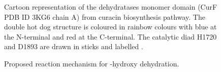 			\setlength\fboxsep{5pt}
 			\setlength\fboxrule{1.5pt}
			\begin{figure} []
			\centering
			\caption[Cartoon representation of the dehydratases domain from curacin biosynthesis pathway]{Cartoon representation of the dehydratases monomer domain (CurF PDB ID 3KG6 chain A) from curacin biosynthesis pathway. The double hot dog structure is coloured in rainbow colours with blue at the N-terminal and red at the C-terminal. The catalytic diad H1720 and D1893 are drawn in sticks and labelled \parencite{Akey2010}.  }
			\label{fig:DH}
			\end{figure}
			
			\setlength\fboxsep{5pt}
 			\setlength\fboxrule{1.5pt}
			\begin{figure} []
			\centering
			\caption[Proposed reaction mechanism for \bet-hydroxy dehydration]{Proposed reaction mechanism for \bet-hydroxy dehydration.}
			\label{fig:DHreact}
			\end{figure}
			

